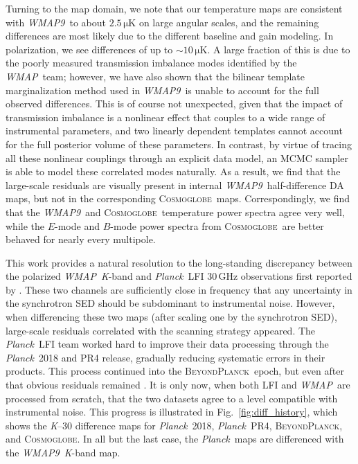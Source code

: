 \documentclass[twocolumn]{../../common/aa}
\def\WMAP{\emph{WMAP}}
\def\WMAPnine{\emph{WMAP9}}
\def\Planck{\emph{Planck}}
\newcommand{\bp}{\textsc{BeyondPlanck}}
\newcommand{\cosmoglobe}{\textsc{Cosmoglobe}}
\newcommand{\K}[0]{\textit K}
\begin{document}
Turning to the map domain, we note that our temperature maps are consistent with \WMAPnine\ to about $2.5\,\mathrm{\mu K}$ on large angular scales, and the remaining differences are most likely due to the different baseline and gain modeling. In polarization, we see differences of up to $\sim10\,\mathrm{\mu K}$. A large fraction of this is due to the poorly measured transmission imbalance modes identified by the \WMAP\ team; however, we have also shown that the bilinear template marginalization method used in \WMAPnine\ is unable to account for the full observed differences. This is of course not unexpected, given that the impact of transmission imbalance is a nonlinear effect that couples to a wide range of instrumental parameters, and two linearly dependent templates cannot account for the full posterior volume of these parameters. In contrast, by virtue of tracing all these nonlinear couplings through an explicit data model, an MCMC sampler is able to model these correlated modes naturally. As a result, we find that the large-scale residuals are visually present in internal \WMAPnine\ half-difference DA maps, but not in the corresponding \cosmoglobe\ maps. Correspondingly, we find that the \WMAPnine\ and \cosmoglobe\ temperature power spectra agree very well, while the $E$-mode and $B$-mode power spectra from \cosmoglobe\ are better behaved for nearly every multipole.

This work provides a natural resolution to the long-standing discrepancy between the polarized \WMAP\ \K-band and \Planck\ LFI 30\,GHz observations first reported by \citet{planck2014-a12}. These two channels are sufficiently close in frequency that any uncertainty in the synchrotron SED should be subdominant to instrumental noise. However, when differencing these two maps (after scaling one by the synchrotron SED), large-scale residuals correlated with the scanning strategy appeared. The \Planck\ LFI team worked hard to improve their data processing through the \Planck\ 2018 and PR4 release, gradually reducing systematic errors in their products. This process continued into the \bp\ epoch, but even after that obvious residuals remained \citep{bp07}. It is only now, when both LFI and \WMAP\ are processed from scratch, that the two datasets agree to a level compatible with instrumental noise. This progress is illustrated in Fig.~\ref{fig:diff_history}, which shows the \K--30 difference maps for \Planck\ 2018, \Planck\ PR4, \bp, and \cosmoglobe. In all but the last case, the \Planck\ maps are differenced with the \WMAPnine\ \K-band map.
\end{document}
